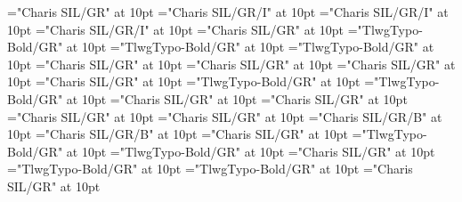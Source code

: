 \documentclass[a4paper,twoside]{article}
\begin{document}
\font\xitemexamplessensesensesentryletDatadicBody="Charis SIL/GR" at 10pt
\font\examplesehxitemexamplessensesensesentryletDatadicBody="Charis SIL/GR/I" at 10pt
\font\spansehexamplesehxitemexamplessensesensesentryletDatadicBody="Charis SIL/GR/I" at 10pt
\font\spanenexamplesehxitemexamplessensesensesentryletDatadicBody="Charis SIL/GR/I" at 10pt
\font\translationsxitemexamplessensesensesentryletDatadicBody="Charis SIL/GR" at 10pt
\font\translationLcpttranslationsxitemexamplessensesensesentryletDatadicBody="TlwgTypo-Bold/GR" at 10pt
\font\xitempttranslationLcpttranslationsxitemexamplessensesensesentryletDatadicBody="TlwgTypo-Bold/GR" at 10pt
\font\spanptxitempttranslationLcpttranslationsxitemexamplessensesensesentryletDatadicBody="TlwgTypo-Bold/GR" at 10pt
\font\spanentranslationLcpttranslationsxitemexamplessensesensesentryletDatadicBody="Charis SIL/GR" at 10pt
\font\xitementranslationLcpttranslationsxitemexamplessensesensesentryletDatadicBody="Charis SIL/GR" at 10pt
\font\spanenxitementranslationLcpttranslationsxitemexamplessensesensesentryletDatadicBody="Charis SIL/GR" at 10pt
\font\xitementryreftypeprimaryrefsentryletDatadicBody="Charis SIL/GR" at 10pt
\font\LexEntryTypepublishStemEntryTypeAbbreviationPubptxitementryreftypeprimaryrefsentryletDatadicBody="TlwgTypo-Bold/GR" at 10pt
\font\spanptLexEntryTypepublishStemEntryTypeAbbreviationPubptxitementryreftypeprimaryrefsentryletDatadicBody="TlwgTypo-Bold/GR" at 10pt
\font\spanenLexEntryTypepublishStemEntryTypeAbbreviationPubptxitementryreftypeprimaryrefsentryletDatadicBody="Charis SIL/GR" at 10pt
\font\relationssensesensesentryletDatadicBody="Charis SIL/GR" at 10pt
\font\lexreftargetsrelationssensesensesentryletDatadicBody="Charis SIL/GR" at 10pt
\font\alexreftargetsrelationssensesensesentryletDatadicBody="Charis SIL/GR" at 10pt
\font\sensecrossrefsehalexreftargetsrelationssensesensesentryletDatadicBody="Charis SIL/GR/B" at 10pt
\font\xsensexrefnumbersensecrossrefsehalexreftargetsrelationssensesensesentryletDatadicBody="Charis SIL/GR/B" at 10pt
\font\spanenrelationssensesensesentryletDatadicBody="Charis SIL/GR" at 10pt
\font{}="TlwgTypo-Bold/GR" at 10pt
\font\spanptdefinitionptsensesensesentryletDatadicBody="TlwgTypo-Bold/GR" at 10pt
\font\spanendefinitionptsensesensesentryletDatadicBody="Charis SIL/GR" at 10pt
\font\translationpttranslationsxitemexamplessensesensesentryletDatadicBody="TlwgTypo-Bold/GR" at 10pt
\font\spanpttranslationpttranslationsxitemexamplessensesensesentryletDatadicBody="TlwgTypo-Bold/GR" at 10pt
\font\spanentranslationpttranslationsxitemexamplessensesensesentryletDatadicBody="Charis SIL/GR" at 10pt
\end{document}
